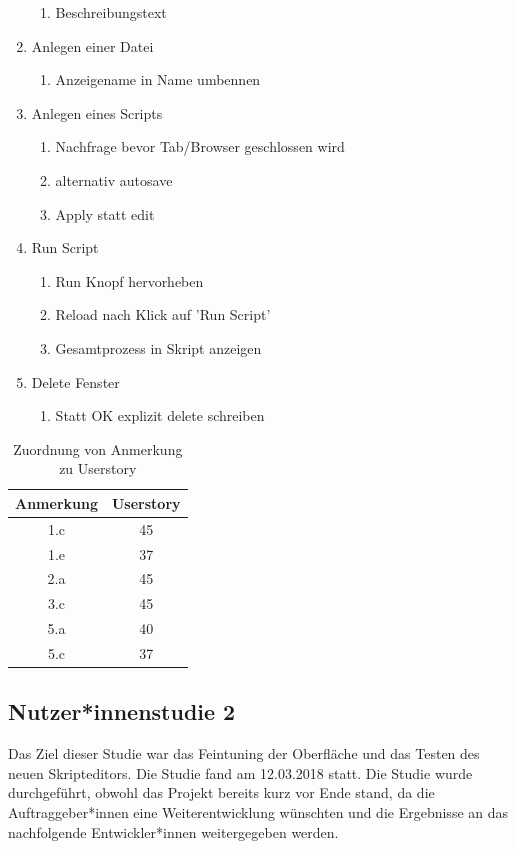 \documentclass[accentcolor=tud9c,12pt,paper=a4]{tudreport}
\begin{document}
\begin{enumerate}
\begin{enumerate}
		\item Beschreibungstext
	\end{enumerate}
	\item Anlegen einer Datei
	\begin{enumerate}
		\item Anzeigename in Name umbennen
	\end{enumerate}
	\item Anlegen eines Scripts
	\begin{enumerate}
		\item Nachfrage bevor Tab/Browser geschlossen wird
		\item alternativ autosave
		\item Apply statt edit
	\end{enumerate}
	\item Run Script
	\begin{enumerate}
		\item Run Knopf hervorheben
		\item Reload nach Klick auf 'Run Script'
		\item Gesamtprozess in Skript anzeigen
	\end{enumerate}
	\item Delete Fenster
	\begin{enumerate}
		\item Statt OK explizit delete schreiben
	\end{enumerate}
	\end{enumerate}

	\begin{table}[H]
		\centering
		\begin{tabular}{c|c}
			Anmerkung & Userstory \\\hline
			1.c & 45\\
			1.e & 37\\
			2.a & 45\\
			3.c & 45\\
			5.a & 40\\
			5.c & 37\\
		\end{tabular}
		\caption{Zuordnung von Anmerkung zu Userstory}
		\label{studie1_us}
	\end{table}

	\subsection{Nutzer*innenstudie 2}
	Das Ziel dieser Studie war das Feintuning der Oberfläche und das Testen des neuen
	Skripteditors. Die Studie fand am 12.03.2018 statt. Die Studie wurde durchgeführt,
	obwohl das Projekt bereits kurz vor Ende stand, da die Auftraggeber*innen eine
	Weiterentwicklung wünschten und die Ergebnisse an das nachfolgende Entwickler*innen
	weitergegeben werden.
	
	
\end{document}
